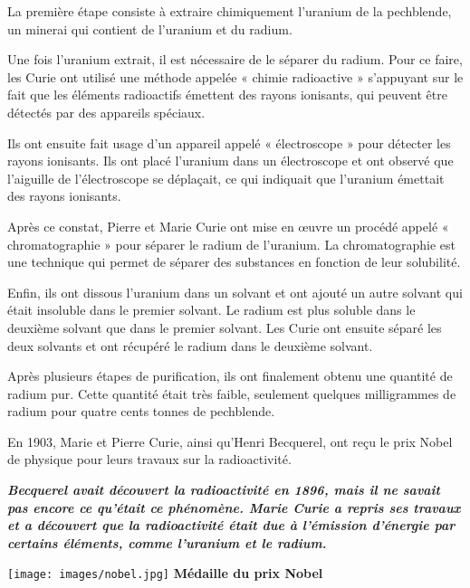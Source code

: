 \begin{rmq}[title={Méthode pour isoler du radium}]
La première étape consiste à extraire chimiquement l'uranium de la pechblende, un minerai qui contient de l'uranium et du radium. 

Une fois l'uranium extrait, il est nécessaire de le séparer du radium. Pour ce faire, les Curie ont utilisé une méthode appelée « chimie radioactive » s'appuyant sur le fait que les éléments radioactifs émettent des rayons ionisants, qui peuvent être détectés par des appareils spéciaux.

Ils ont ensuite fait usage d'un appareil appelé « électroscope » pour détecter les rayons ionisants. Ils ont placé l'uranium dans un électroscope et ont observé que l'aiguille de l'électroscope se déplaçait, ce qui indiquait que l'uranium émettait des rayons ionisants.

Après ce constat, Pierre et Marie Curie ont mise en \oe{}uvre un procédé appelé « chromatographie » pour séparer le radium de l'uranium. La chromatographie est une technique qui permet de séparer des substances en fonction de leur solubilité.

Enfin, ils ont dissous l'uranium dans un solvant et ont ajouté un autre solvant qui était insoluble dans le premier solvant. Le radium est plus soluble dans le deuxième solvant que dans le premier solvant. Les Curie ont ensuite séparé les deux solvants et ont récupéré le radium dans le deuxième solvant.

Après plusieurs étapes de purification, ils ont finalement obtenu une quantité de radium pur. Cette quantité était très faible, seulement quelques milligrammes de radium pour quatre cents tonnes de pechblende.
\end{rmq}


En 1903, Marie et Pierre Curie, ainsi qu'Henri Becquerel, ont reçu le prix Nobel de physique pour leurs travaux sur la radioactivité.

\begin{minipage}{0.7\linewidth}

\textbf{\itshape Becquerel avait découvert la radioactivité en 1896, mais il ne savait pas encore ce qu'était ce phénomène. Marie Curie a repris ses travaux et a découvert que la radioactivité était due à l'émission d'énergie par certains éléments, comme l'uranium et le radium.}
    
\end{minipage}
\begin{minipage}{0.3\linewidth}
    \begin{center}
    \texttt{[image: images/nobel.jpg]}
        \bfseries Médaille du prix Nobel
    \end{center}
\end{minipage}


